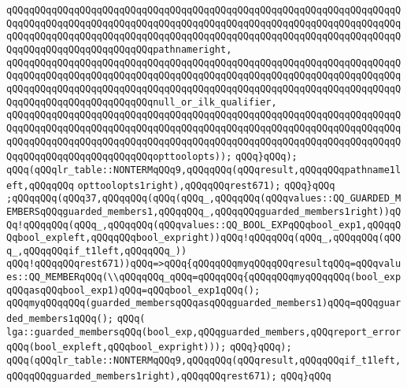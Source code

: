 \verb|qQQqqQQqqQQqqQQqqQQqqQQqqQQqqQQqqQQqqQQqqQQqqQQqqQQqqQQqqQQqqQQqqQQqqQQqqQQqqQQqqQQqqQQqqQQqqQQqqQQqqQQqqQQqqQQqqQQqqQQqqQQqqQQqqQQqqQQqqQQqqQQqqQQqqQQqqQQqqQQqqQQqqQQqqQQqqQQqqQQqqQQqqQQqqQQqqQQqqQQqqQQqqQQqqQQqqQQqqQQqqQQqqQQqqQQqqQQqpathnameright,|\newline
\verb|qQQqqQQqqQQqqQQqqQQqqQQqqQQqqQQqqQQqqQQqqQQqqQQqqQQqqQQqqQQqqQQqqQQqqQQqqQQqqQQqqQQqqQQqqQQqqQQqqQQqqQQqqQQqqQQqqQQqqQQqqQQqqQQqqQQqqQQqqQQqqQQqqQQqqQQqqQQqqQQqqQQqqQQqqQQqqQQqqQQqqQQqqQQqqQQqqQQqqQQqqQQqqQQqqQQqqQQqqQQqqQQqqQQqqQQqqQQqnull_or_ilk_qualifier,|\newline
\verb|qQQqqQQqqQQqqQQqqQQqqQQqqQQqqQQqqQQqqQQqqQQqqQQqqQQqqQQqqQQqqQQqqQQqqQQqqQQqqQQqqQQqqQQqqQQqqQQqqQQqqQQqqQQqqQQqqQQqqQQqqQQqqQQqqQQqqQQqqQQqqQQqqQQqqQQqqQQqqQQqqQQqqQQqqQQqqQQqqQQqqQQqqQQqqQQqqQQqqQQqqQQqqQQqqQQqqQQqqQQqqQQqqQQqqQQqqQQqopttoolopts));|\newline
\verb|qQQq}qQQq);|\newline
\verb|qQQq(qQQqlr_table::NONTERMqQQq9,qQQqqQQq(qQQqresult,qQQqqQQqpathname1left,qQQqqQQq|\newline
\verb|opttoolopts1right),qQQqqQQqrest671);|\newline
\verb|qQQq}qQQq|\newline
\verb|;qQQqqQQq(qQQq37,qQQqqQQq(qQQq(qQQq_,qQQqqQQq(qQQqvalues::QQ_GUARDED_MEMBERSqQQqguarded_members1,qQQqqQQq_,qQQqqQQqguarded_members1right))qQQq!qQQqqQQq(qQQq_,qQQqqQQq(qQQqvalues::QQ_BOOL_EXPqQQqbool_exp1,qQQqqQQqbool_expleft,qQQqqQQqbool_expright))qQQq!qQQqqQQq(qQQq_,qQQqqQQq(qQQq_,qQQqqQQqif_t1left,qQQqqQQq_))|\newline
\verb|qQQq!qQQqqQQqrest671))qQQq=>qQQq{qQQqqQQqmyqQQqqQQqresultqQQq=qQQqvalues::QQ_MEMBERqQQq(\\qQQqqQQq_qQQq=qQQqqQQq{qQQqqQQqmyqQQqqQQq(bool_expqQQqasqQQqbool_exp1)qQQq=qQQqbool_exp1qQQq();|\newline
\verb|qQQqmyqQQqqQQq(guarded_membersqQQqasqQQqguarded_members1)qQQq=qQQqguarded_members1qQQq();|\newline
\verb|qQQq(|\newline
\verb|lga::guarded_membersqQQq(bool_exp,qQQqguarded_members,qQQqreport_errorqQQq(bool_expleft,qQQqbool_expright)));|\newline
\verb|qQQq}qQQq);|\newline
\verb|qQQq(qQQqlr_table::NONTERMqQQq9,qQQqqQQq(qQQqresult,qQQqqQQqif_t1left,qQQqqQQqguarded_members1right),qQQqqQQqrest671);|\newline
\verb|qQQq}qQQq|\newline
